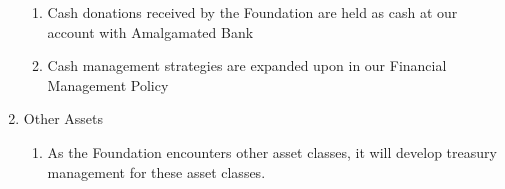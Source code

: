 \documentclass{article}
\begin{document}
\begin{enumerate}
\begin{enumerate}
\item Cash donations received by the Foundation are held as cash at our account with Amalgamated Bank
\item Cash management strategies are expanded upon in our Financial Management Policy
\end{enumerate}
\item Other Assets
\begin{enumerate}
\item As the Foundation encounters other asset classes, it will develop treasury management for these asset classes.
\end{enumerate}
\end{enumerate}
\end{document}
